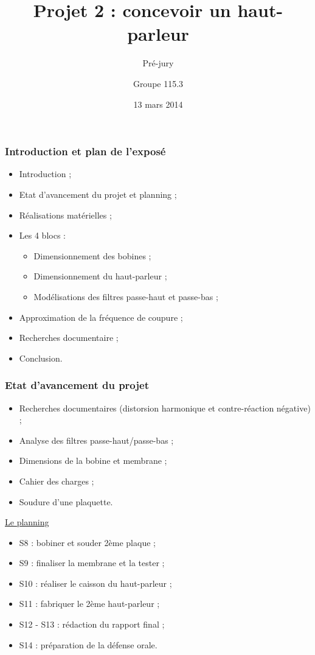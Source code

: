 \documentclass[pdf]{beamer}
\title{Projet 2 : concevoir un haut-parleur}
\subtitle{Pré-jury}
\author{Groupe 115.3}
\date{13 mars 2014}
\begin{document}
\begin{frame}
	\titlepage
\end{frame}

\begin{frame}
	\frametitle{Introduction et plan de l'exposé}
	
	\begin{itemize}
		\item Introduction ;
		\item Etat d'avancement du projet et planning ;
		\item Réalisations matérielles ;
		\item Les 4 blocs :
			\begin{itemize}
				\item Dimensionnement des bobines ;
				\item Dimensionnement du haut-parleur ;
				\item Modélisations des filtres passe-haut et passe-bas ;
			\end{itemize}
		\item Approximation de la fréquence de coupure ;
		\item Recherches documentaire ;
		\item Conclusion.
	\end{itemize}
\end{frame}

\begin{frame}
	\frametitle{Etat d'avancement du projet}	

	\begin{itemize}
		\item Recherches documentaires (distorsion harmonique et contre-réaction négative) ;
		\item Analyse des filtres passe-haut/passe-bas ;
		\item Dimensions de la bobine et membrane ;
		\item Cahier des charges ;
		\item Soudure d'une plaquette.
	\end{itemize}

	\underline{Le planning}
	\begin{itemize}
		\item S8 : bobiner et souder 2ème plaque ;
		\item S9 : finaliser la membrane et la tester ;
		\item S10 : réaliser le caisson du haut-parleur ;
		\item S11 : fabriquer le 2ème haut-parleur ;
		\item S12 - S13 : rédaction du rapport final ;
		\item S14 : préparation de la défense orale.
	\end{itemize}
\end{frame}
	
\end{document}
